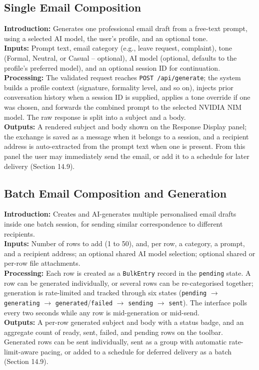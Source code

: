 \documentclass[12pt,a4paper]{article}
\begin{document}
\subsection{Single Email Composition}
\noindent\textbf{Introduction:} Generates one professional email draft from a free-text prompt, using a selected AI model, the user's profile, and an optional tone.\\
\noindent\textbf{Inputs:} Prompt text, email category (e.g., leave request, complaint), tone (Formal, Neutral, or Casual -- optional), AI model (optional, defaults to the profile's preferred model), and an optional session ID for continuation.\\
\noindent\textbf{Processing:} The validated request reaches \texttt{POST /api/generate}; the system builds a profile context (signature, formality level, and so on), injects prior conversation history when a session ID is supplied, applies a tone override if one was chosen, and forwards the combined prompt to the selected NVIDIA NIM model. The raw response is split into a subject and a body.\\
\noindent\textbf{Outputs:} A rendered subject and body shown on the Response Display panel; the exchange is saved as a message when it belongs to a session, and a recipient address is auto-extracted from the prompt text when one is present. From this panel the user may immediately send the email, or add it to a schedule for later delivery (Section 14.9).

\subsection{Batch Email Composition and Generation}
\noindent\textbf{Introduction:} Creates and AI-generates multiple personalised email drafts inside one batch session, for sending similar correspondence to different recipients.\\
\noindent\textbf{Inputs:} Number of rows to add (1 to 50), and, per row, a category, a prompt, and a recipient address; an optional shared AI model selection; optional shared or per-row file attachments.\\
\noindent\textbf{Processing:} Each row is created as a \texttt{BulkEntry} record in the \texttt{pending} state. A row can be generated individually, or several rows can be re-categorised together; generation is rate-limited and tracked through six states (\texttt{pending} $\rightarrow$ \texttt{generating} $\rightarrow$ \texttt{generated}/\texttt{failed} $\rightarrow$ \texttt{sending} $\rightarrow$ \texttt{sent}). The interface polls every two seconds while any row is mid-generation or mid-send.\\
\noindent\textbf{Outputs:} A per-row generated subject and body with a status badge, and an aggregate count of ready, sent, failed, and pending rows on the toolbar. Generated rows can be sent individually, sent as a group with automatic rate-limit-aware pacing, or added to a schedule for deferred delivery as a batch (Section 14.9).
\end{document}
